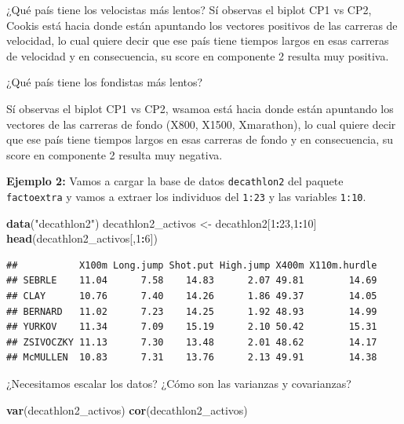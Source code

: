 \documentclass[
]{book}
\newenvironment{Shaded}{\begin{snugshade}}{\end{snugshade}}
\newcommand{\DecValTok}[1]{\textcolor[rgb]{0.00,0.00,0.81}{#1}}
\newcommand{\FunctionTok}[1]{\textcolor[rgb]{0.13,0.29,0.53}{\textbf{#1}}}
\newcommand{\NormalTok}[1]{#1}
\newcommand{\OtherTok}[1]{\textcolor[rgb]{0.56,0.35,0.01}{#1}}
\newcommand{\SpecialCharTok}[1]{\textcolor[rgb]{0.81,0.36,0.00}{\textbf{#1}}}
\newcommand{\StringTok}[1]{\textcolor[rgb]{0.31,0.60,0.02}{#1}}
\begin{document}
¿Qué país tiene los velocistas más lentos?
Sí observas el biplot CP1 vs CP2, Cookis está hacia donde están apuntando los vectores
positivos de las carreras de velocidad, lo cual quiere decir que ese país tiene tiempos
largos en esas carreras de velocidad y en consecuencia, su score en componente 2
resulta muy positiva.

¿Qué país tiene los fondistas más lentos?

Sí observas el biplot CP1 vs CP2, wsamoa está hacia donde están apuntando los vectores
de las carreras de fondo (X800, X1500, Xmarathon), lo cual quiere decir que ese país tiene tiempos largos en esas carreras de fondo y en consecuencia, su score en componente 2 resulta muy negativa.

\textbf{Ejemplo 2:} Vamos a cargar la base de datos \texttt{decathlon2} del paquete \texttt{factoextra} y vamos a extraer los individuos del \texttt{1:23} y las variables \texttt{1:10}.

\begin{Shaded}
\begin{Highlighting}[]
\FunctionTok{data}\NormalTok{(}\StringTok{"decathlon2"}\NormalTok{)}
\NormalTok{decathlon2\_activos }\OtherTok{\textless{}{-}}\NormalTok{ decathlon2[}\DecValTok{1}\SpecialCharTok{:}\DecValTok{23}\NormalTok{,}\DecValTok{1}\SpecialCharTok{:}\DecValTok{10}\NormalTok{]}
\FunctionTok{head}\NormalTok{(decathlon2\_activos[,}\DecValTok{1}\SpecialCharTok{:}\DecValTok{6}\NormalTok{])}
\end{Highlighting}
\end{Shaded}

\begin{verbatim}
##           X100m Long.jump Shot.put High.jump X400m X110m.hurdle
## SEBRLE    11.04      7.58    14.83      2.07 49.81        14.69
## CLAY      10.76      7.40    14.26      1.86 49.37        14.05
## BERNARD   11.02      7.23    14.25      1.92 48.93        14.99
## YURKOV    11.34      7.09    15.19      2.10 50.42        15.31
## ZSIVOCZKY 11.13      7.30    13.48      2.01 48.62        14.17
## McMULLEN  10.83      7.31    13.76      2.13 49.91        14.38
\end{verbatim}

¿Necesitamos escalar los datos? ¿Cómo son las varianzas y covarianzas?

\begin{Shaded}
\begin{Highlighting}[]
\FunctionTok{var}\NormalTok{(decathlon2\_activos)}
\FunctionTok{cor}\NormalTok{(decathlon2\_activos)}
\end{Highlighting}
\end{Shaded}
\end{document}
